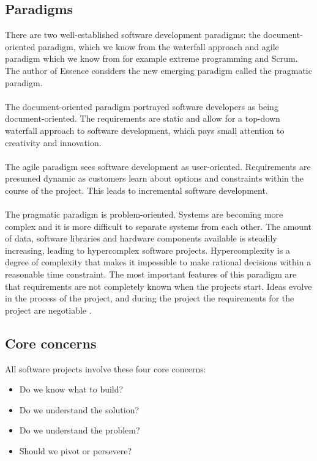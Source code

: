 \subsection{Paradigms}
There are two well-established software development paradigms: the document-oriented paradigm, which we know from the waterfall approach and agile paradigm which we know from for example extreme programming and Scrum.
The author of Essence considers the new emerging paradigm called the pragmatic paradigm.
\\\\
The document-oriented paradigm portrayed software developers as being document-oriented. 
The requirements are static and allow for a top-down waterfall approach to software development, which pays small attention to creativity and innovation.
\\\\
The agile paradigm sees software development as user-oriented.
Requirements are presumed dynamic as customers learn about options and constraints within the course of the project.
This leads to incremental software development.
\\\\
The pragmatic paradigm is problem-oriented. 
Systems are becoming more complex and it is more difficult to separate systems from each other. 
The amount of data, software libraries and hardware components available is steadily increasing, leading to hypercomplex software projects.
Hypercomplexity is a degree of complexity that makes it impossible to make rational decisions within a reasonable time constraint.
The most important features of this paradigm are that requirements are not completely known when the projects start.
Ideas evolve in the process of the project, and during the project the requirements for the project are negotiable \autocite{Essence}. 

\subsection{Core concerns}
All software projects involve these four core concerns:

\begin{itemize}
    \item Do we know what to build?
    \item Do we understand the solution?
    \item Do we understand the problem?
    \item Should we pivot or persevere?
\end{itemize}


